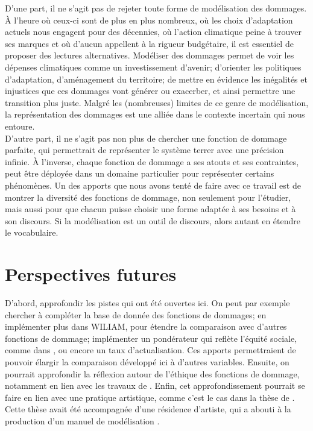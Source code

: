 D'une part, il ne s'agit pas de rejeter toute forme de modélisation des dommages. À l'heure où ceux-ci sont de plus en plus nombreux, où les choix d'adaptation actuels nous engagent pour des décennies, où l'action climatique peine à trouver ses marques et où d'aucun appellent à la rigueur budgétaire, il est essentiel de proposer des lectures alternatives. Modéliser des dommages permet de voir les dépenses climatiques comme un investissement d'avenir; d'orienter les politiques d'adaptation, d'aménagement du territoire; de mettre en évidence les inégalités et injustices que ces dommages vont générer ou exacerber, et ainsi permettre une transition plus juste. Malgré les (nombreuses) limites de ce genre de modélisation, la représentation des dommages est une alliée dans le contexte incertain qui nous entoure. \\

D'autre part, il ne s'agit pas non plus de chercher une fonction de dommage parfaite, qui permettrait de représenter le système terrer avec une précision infinie. À l'inverse, chaque fonction de dommage a ses atouts et ses contraintes, peut être déployée dans un domaine particulier pour représenter certains phénomènes. Un des apports que nous avons tenté de faire avec ce travail est de montrer la diversité des fonctions de dommage, non seulement pour l'étudier, mais aussi pour que chacun puisse choisir une forme adaptée à ses besoins et à son discours. Si la modélisation est un outil de discours, alors autant en étendre le vocabulaire. 

\section{Perspectives futures}

D'abord, approfondir les pistes qui ont été ouvertes ici. On peut par exemple chercher à compléter la base de donnée des fonctions de dommages; en implémenter plus dans WILIAM, pour étendre la comparaison avec d'autres fonctions de dommage; implémenter un pondérateur qui reflète l'équité sociale, comme dans \textcite{dennig_inequality_2015}, ou encore un taux d'actualisation. Ces apports permettraient de pouvoir élargir la comparaison développé ici à d'autres variables. Ensuite, on pourrait  approfondir la réflexion autour de l'éthique des fonctions de dommage, notamment en lien avec les travaux de \textcite{pacchetti_for_2024}. Enfin, cet approfondissement pourrait se faire en lien avec une pratique artistique, comme c'est le cas dans la thèse de \textcite{van_beek_persuasive_2023}. Cette thèse avait été accompagnée d'une résidence d'artiste, qui a abouti à la production d'un manuel de modélisation \autocite{noauthor_future_nodate}. \\


